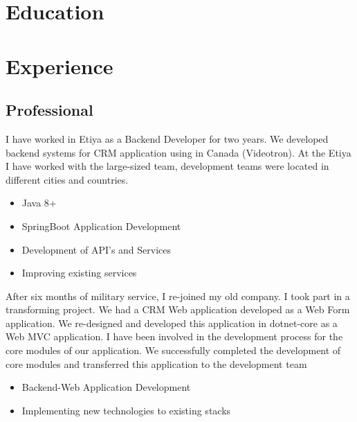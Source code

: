 \documentclass[11pt,a4paper,sans]{moderncv}
\begin{document}
\makecvtitle
\section{Education}

\section{Experience}
\subsection{Professional}
{
	\textnormal
	{
		I have worked in Etiya as a Backend Developer for two years. We developed backend systems for CRM application using in Canada (Videotron). At the Etiya I have worked with the large-sized team, development teams were located in different cities and countries.
	}
	\\
	\begin{itemize}%
		\item Java 8+
		\item SpringBoot Application Development
		\item Development of API's and Services
		\item Improving existing services \\
	\end{itemize}
}
{
	\textnormal
	{
		After six months of military service, I re-joined my old company. I took part in a transforming project. We had a CRM Web application developed as a Web Form application. We re-designed and developed this application in dotnet-core as a Web MVC application. I have been involved in the development process for the core modules of our application. We successfully completed the development of core modules and transferred this application to the development team
	}
	\\
	\begin{itemize}%
		\item Backend-Web Application Development
		\item Implementing new technologies to existing stacks \\
	\end{itemize}
}
\end{document}
